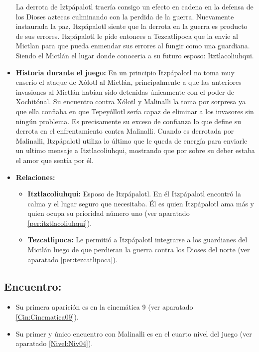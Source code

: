 \begin{itemize}
	La derrota de Iztpápalotl traería consigo un efecto en cadena en la defensa de los Dioses aztecas culminando con la perdida de la guerra. Nuevamente instaurada la paz, Itzpápalotl siente que la derrota en la guerra es producto de sus errores. Itzpápalotl le pide entonces a Tezcatlipoca que la envie al Mictlan para que pueda enmendar sus errores al fungir como una guardiana. Siendo el Mictlán el lugar donde conoceria a su futuro esposo: Itztlacoliuhqui. 
	\item \textbf{Historia durante el juego:}
	En un principio Itzpápalotl no toma muy enserio el ataque de Xólotl al Mictlán, principalmente a que las anteriores invasiones al Mictlán habían sido detenidas únicamente con el poder de Xochitónal. Su encuentro contra Xólotl y Malinalli la toma por sorpresa ya que ella confiaba en que Tepeyóllotl sería capaz de eliminar a los invasores sin ningún problema. Es precisamente su exceso de confianza lo que define su  derrota en el enfrentamiento contra Malinalli. Cuando es derrotada por Malinalli, Itzpápalotl utiliza lo último que le queda de energía para enviarle un ultimo mensaje a Itztlacoliuhqui, mostrando que por sobre su deber estaba el amor que sentía por él.
	\item \textbf{Relaciones:}
	\begin{itemize}
		\item \textbf{Itztlacoliuhqui:} Esposo de Itzpápalotl. En él Itzpápalotl encontró la calma y el lugar seguro que necesitaba. Él es quien Itzpápalotl ama más y quien ocupa su prioridad número uno (ver aparatado \ref{per:itztlacoliuhqui}).  
		\item \textbf{Tezcatlipoca:} Le permitió a Itzpápalotl integrarse a los guardianes del Mictlán luego de que perdieran la guerra contra los Dioses del norte (ver aparatado \ref{per:tezcatlipoca}).   
	\end{itemize}                     
\end{itemize}

\subsection{Encuentro:}
\begin{itemize}
	\item Su primera aparición es en la cinemática 9 (ver aparatado \ref{Cin:Cinematica09}). 
	\item Su primer y único encuentro con Malinalli es en el cuarto nivel del juego (ver aparatado \ref{Nivel:Niv04}).
\end{itemize}
